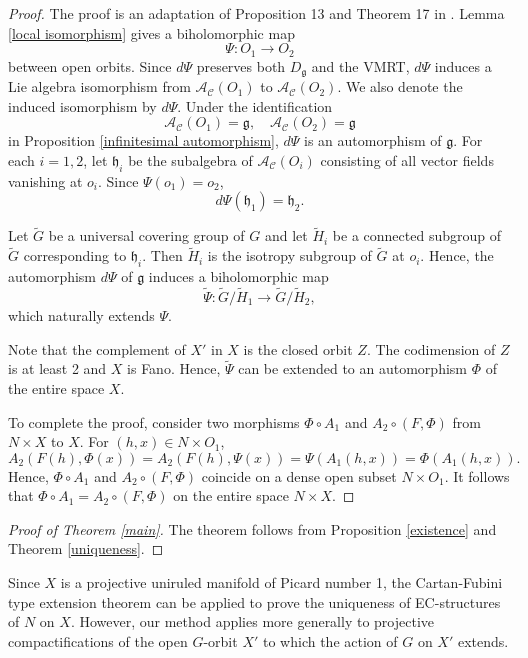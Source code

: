 \documentclass{amsart}
\theoremstyle{definition}
\theoremstyle{remark}
\newcommand{\g}{\mathfrak{g}}
\begin{document}
\begin{proof}
The proof is an adaptation of Proposition 13 and Theorem 17 in \cite{C}. Lemma \ref{local isomorphism} gives a biholomorphic map 
\[\Psi : O_1 \to O_2\]
between open orbits. Since \(d\Psi\) preserves both $D_\g$ and the VMRT, $d\Psi$ induces a Lie algebra isomorphism from $\mathcal{A}_\mathscr{C}(O_1)$ to \(\mathcal{A}_\mathscr{C}(O_2)\). We also denote the induced isomorphism by $d\Psi$. Under the identification 
\[\mathcal{A}_\mathscr{C}(O_1) = \g,\quad \mathcal{A}_\mathscr{C}(O_2)= \g\]
in Proposition \ref{infinitesimal automorphism}, $d\Psi$ is an automorphism of $\g$. For each $i = 1, 2$, let $\mathfrak{h}_i$ be the subalgebra of $\mathcal{A}_\mathscr{C}(O_i)$ consisting of all vector fields vanishing at $o_i$. Since $\Psi(o_1) = o_2$, 
\[d\Psi (\mathfrak{h}_1) = \mathfrak{h}_2.\]


Let \(\tilde G\) be a universal covering group of \(G\) and let \(\tilde H_i\) be a connected subgroup of \(\tilde G\) corresponding to \(\mathfrak{h}_i\). Then \(\tilde H_i\) is the isotropy subgroup of \(\tilde G\) at \(o_i\). Hence, the automorphism $d\Psi$ of \(\mathfrak{g}\) induces a biholomorphic map 
\[\widetilde\Psi : \tilde G / \tilde H_1 \to \tilde G / \tilde H_2,\] 
which naturally extends $\Psi$.


Note that the complement of $X'$ in $X$ is the closed orbit $Z$. The codimension of $Z$ is at least 2 and $X$ is Fano. Hence, $\widetilde{\Psi}$ can be extended to an automorphism $\Phi$ of the entire space $X$.


To complete the proof, consider two morphisms  $\Phi \circ A_1$ and $A_2 \circ (F, \Phi)$ from $N \times X$ to $X$. For $(h, x) \in N \times O_1$, 
\[A_2(F(h), \Phi(x)) = A_2(F(h), \Psi(x)) = \Psi(A_1(h, x)) = \Phi(A_1(h,x)).\]
Hence, $\Phi \circ A_1$ and $A_2 \circ (F, \Phi)$ coincide on a dense open subset \(N \times O_1\). It follows that \(\Phi \circ A_1 = A_2 \circ (F, \Phi)\) on the entire space \(N \times X\).
\end{proof}


\begin{proof}[Proof of Theorem \ref{main}]
The theorem follows from Proposition \ref{existence} and Theorem \ref{uniqueness}.
\end{proof}


Since $X$ is a projective uniruled manifold of Picard number 1, the Cartan-Fubini type extension theorem can be applied to prove the uniqueness of EC-structures of $N$ on $X$. However, our method applies more generally to projective compactifications of the open $G$-orbit $X'$ to which the action of $G$ on $X'$ extends.
\end{document}

